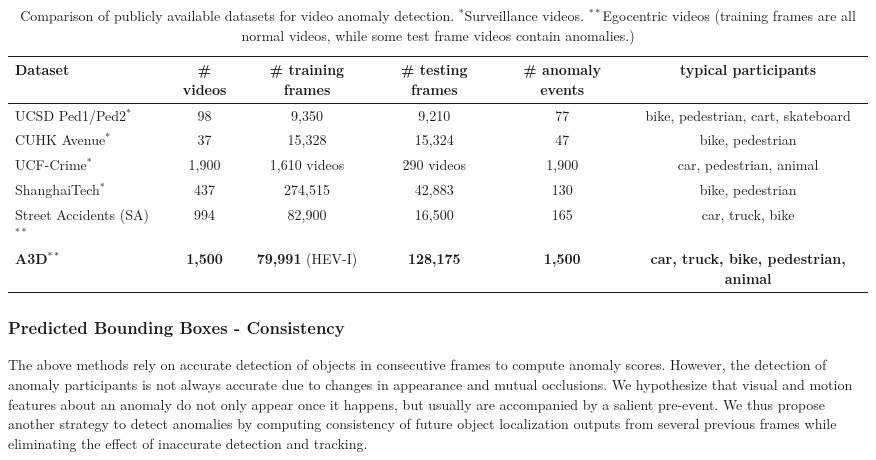 \documentclass[letterpaper, 10 pt, conference]{ieeeconf}
\theoremstyle{definition}
\theoremstyle{remark}
\begin{document}
\begin{table*}[h]
    \vspace{5pt}
    \centering
    \renewcommand{\arraystretch}{1.3}
    \caption{Comparison of publicly available datasets for video anomaly detection.
    $^*$Surveillance videos. $^{**}$Egocentric videos (training frames are all normal videos, while some test frame videos contain anomalies.) }
    \label{tab:dataset}
    \begin{tabular}{l|c|c|c|c|c}
        \toprule
        Dataset & \# videos & \# training frames & \# testing frames & \# anomaly events & typical participants \\
        \midrule
        UCSD Ped1/Ped2$^*$~\cite{li2014anomaly} & 98 & 9,350 & 9,210 & 77 & bike, pedestrian, cart, skateboard \\
        CUHK Avenue$^*$~\cite{lu2013abnormal} & 37 & 15,328 & 15,324 & 47 & bike, pedestrian  \\
        UCF-Crime$^*$~\cite{Sultani_2018_CVPR} & 1,900 &1,610 videos & 290 videos & 1,900 & car, pedestrian, animal \\
        ShanghaiTech$^*$~\cite{luo2017revisit} & 437 & 274,515 & 42,883 & 130 & bike, pedestrian \\
        Street Accidents (SA)$^{**}$~\cite{chan2016anticipating} & 994 & 82,900 & 16,500 & 165 & car, truck, bike \\
        \textbf{A3D}$^{**}$ & \textbf{1,500} & \textbf{79,991} (HEV-I) & \textbf{128,175} & \textbf{1,500} & \textbf{car, truck, bike, pedestrian, animal}  \\
        \bottomrule
    \end{tabular}
    \vspace{-15pt}
\end{table*}

\subsubsection{Predicted Bounding Boxes - Consistency}
\label{sec:metrics_three}
The above methods rely on accurate detection of objects in consecutive
frames to compute anomaly scores. However, the detection of anomaly
participants is not always accurate due to changes in appearance
and mutual occlusions. We hypothesize that visual and motion features
about an anomaly do not only appear once it happens, but usually are
accompanied by a salient pre-event. We thus propose another strategy
to detect anomalies by computing consistency of future object localization
outputs from several previous frames while eliminating the effect of
inaccurate detection and tracking.
\end{document}

